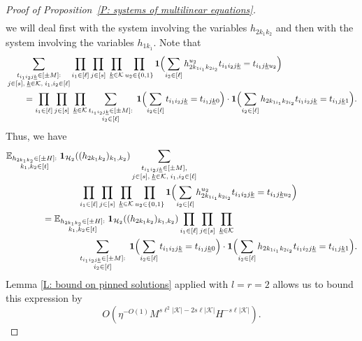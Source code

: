 \documentclass[10pt,a4paper]{amsart}
\newcommand{\Bigbrac}[1]{\Bigl( #1 \Bigr)}
\newcommand{\CH}{{\mathcal H}}
\newcommand{\CK}{{\mathcal K}}
\newcommand{\E}{{\mathbb E}}
\newcommand{\uk}{{\underline{k}}}
\begin{document}
\begin{proof}[Proof of Proposition~\ref{P: systems of multilinear equations}]
\begin{align*}
    \end{align*}
    we will deal first with the system involving the variables $h_{2k_1k_2}$ and then with the system involving the variables $h_{1k_1}$. Note that
    \begin{align*}
        &\sum_{\substack{t_{i_1 i_2 j\uk}\in[\pm M]:\\ j\in[s],\; \uk\in\CK,\; i_1, i_2\in[\ell]}}\prod_{i_1\in[\ell]}\prod_{j\in[s]}\; \prod_{\substack{\uk\in\CK}}\prod_{\substack{u_2\in\{0,1\}}} \mathbf{1}\Bigbrac{\sum\limits_{i_2\in[\ell]} h_{2k_{1i_1}k_{2i_2}}^{u_2} t_{i_1 i_2 j\uk} = t_{i_1 j\uk u_2}}\\
        &\qquad=\prod_{i_1\in[\ell]}\prod_{j\in[s]}\; \prod_{\substack{\uk\in\CK}}\sum_{\substack{t_{i_1 i_2 j\uk}\in[\pm M]:\\ i_2\in[\ell]}}\; \mathbf{1}\Bigbrac{\sum\limits_{i_2\in[\ell]} t_{i_1 i_2 j\uk} = t_{i_1 j\uk 0}}\cdot \mathbf{1}\Bigbrac{\sum\limits_{i_2\in[\ell]} h_{2k_{1i_1}k_{2i_2}} t_{i_1 i_2 j\uk} = t_{i_1 j\uk 1}}.
    \end{align*}
    Thus, we have
    \begin{align*}
        &\E_{\substack{h_{2k_1k_2}\in[\pm H]:\\  k_1, k_2\in[t]}}\; \mathbf{1}_{\CH_2}((h_{2k_1k_2})_{k_1, k_2})
        \sum_{\substack{t_{i_1 i_2 j\uk}\in[\pm M],\\ j\in[s],\; \uk\in\CK,\; i_1, i_2\in[\ell]}}\\
        &\qquad\qquad\qquad\qquad\prod_{i_1\in[\ell]}\prod_{j\in[s]}\; \prod_{\substack{\uk\in\CK}}\prod_{\substack{u_2\in\{0,1\}}} \mathbf{1}\Bigbrac{\sum\limits_{i_2\in[\ell]} h_{2k_{1i_1}k_{2i_2}}^{u_2} t_{i_1 i_2 j\uk} = t_{i_1 j\uk u_2}}\\
        &\qquad\qquad= \E_{\substack{h_{2k_1k_2}\in[\pm H]:\\  k_1, k_2\in[t]}}\; \mathbf{1}_{\CH_2}((h_{2k_1k_2})_{k_1, k_2})\prod_{i_1\in[\ell]}\prod_{j\in[s]}\; \prod_{\substack{\uk\in\CK}}\\ 
        &\qquad\qquad\qquad\qquad\sum_{\substack{t_{i_1 i_2 j\uk}\in[\pm M]:\\ i_2\in[\ell]}}\; \mathbf{1}\Bigbrac{\sum\limits_{i_2\in[\ell]} t_{i_1 i_2 j\uk} = t_{i_1 j\uk 0}}\cdot \mathbf{1}\Bigbrac{\sum\limits_{i_2\in[\ell]} h_{2k_{1i_1}k_{2i_2}} t_{i_1 i_2 j\uk} = t_{i_1 j\uk 1}}.
    \end{align*}
    Lemma \ref{L: bound on pinned solutions} applied with $l=r=2$ allows us to bound this expression by 
    $$O(\eta^{-O(1)} M^{s\ell^2|\CK|-2s\ell|\CK|} H^{-s\ell|\CK|}).$$

\end{proof}
\end{document}
